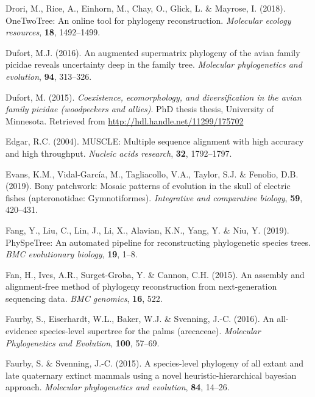 \documentclass[]{article}
\begin{document}
\leavevmode\hypertarget{ref-drori2018onetwotree}{}%
Drori, M., Rice, A., Einhorn, M., Chay, O., Glick, L. \& Mayrose, I. (2018). OneTwoTree: An online tool for phylogeny reconstruction. \emph{Molecular ecology resources}, \textbf{18}, 1492--1499.

\leavevmode\hypertarget{ref-dufort2016augmented}{}%
Dufort, M.J. (2016). An augmented supermatrix phylogeny of the avian family picidae reveals uncertainty deep in the family tree. \emph{Molecular phylogenetics and evolution}, \textbf{94}, 313--326.

\leavevmode\hypertarget{ref-dufort2015coexistence}{}%
Dufort, M. (2015). \emph{Coexistence, ecomorphology, and diversification in the avian family picidae (woodpeckers and allies)}. PhD thesis thesis, University of Minnesota. Retrieved from \url{http://hdl.handle.net/11299/175702}

\leavevmode\hypertarget{ref-edgar2004muscle}{}%
Edgar, R.C. (2004). MUSCLE: Multiple sequence alignment with high accuracy and high throughput. \emph{Nucleic acids research}, \textbf{32}, 1792--1797.

\leavevmode\hypertarget{ref-evans2019bony}{}%
Evans, K.M., Vidal-García, M., Tagliacollo, V.A., Taylor, S.J. \& Fenolio, D.B. (2019). Bony patchwork: Mosaic patterns of evolution in the skull of electric fishes (apteronotidae: Gymnotiformes). \emph{Integrative and comparative biology}, \textbf{59}, 420--431.

\leavevmode\hypertarget{ref-fang2019physpetree}{}%
Fang, Y., Liu, C., Lin, J., Li, X., Alavian, K.N., Yang, Y. \& Niu, Y. (2019). PhySpeTree: An automated pipeline for reconstructing phylogenetic species trees. \emph{BMC evolutionary biology}, \textbf{19}, 1--8.

\leavevmode\hypertarget{ref-fan2015assembly}{}%
Fan, H., Ives, A.R., Surget-Groba, Y. \& Cannon, C.H. (2015). An assembly and alignment-free method of phylogeny reconstruction from next-generation sequencing data. \emph{BMC genomics}, \textbf{16}, 522.

\leavevmode\hypertarget{ref-faurby2016all}{}%
Faurby, S., Eiserhardt, W.L., Baker, W.J. \& Svenning, J.-C. (2016). An all-evidence species-level supertree for the palms (arecaceae). \emph{Molecular Phylogenetics and Evolution}, \textbf{100}, 57--69.

\leavevmode\hypertarget{ref-faurby2015species}{}%
Faurby, S. \& Svenning, J.-C. (2015). A species-level phylogeny of all extant and late quaternary extinct mammals using a novel heuristic-hierarchical bayesian approach. \emph{Molecular phylogenetics and evolution}, \textbf{84}, 14--26.
\end{document}
